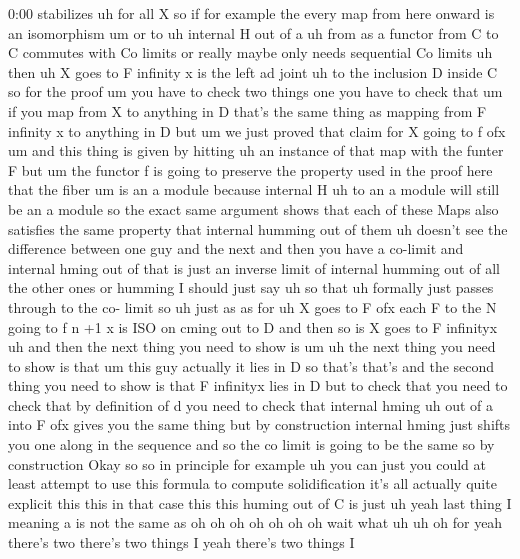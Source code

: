 \begin{unfinished}{0:00}
stabilizes
uh  for  all  X  so  if  for  example
the  every  map  from  here  onward  is  an
isomorphism
um
or
to  uh  internal  H  out  of  a  uh  from  as  a
functor  from  C  to  C  commutes  with  Co
limits  or  really  maybe  only  needs
sequential  Co
limits  uh  then
uh  X  goes  to  F  infinity  x  is  the  left  ad
joint  uh  to  the  inclusion  D  inside
C  so  for  the  proof
um  you  have  to  check  two  things  one  you
have  to  check  that  um  if  you  map  from  X
to  anything  in  D  that's  the  same  thing
as  mapping  from  F  infinity  x  to  anything
in  D  but
um  we  just  proved  that  claim  for  X  going
to  f
ofx  um  and  this  thing  is  given  by
hitting  uh  an  instance  of  that  map  with
the  funter  F  but  um  the  functor  f  is
going  to  preserve  the  property  used  in
the  proof  here  that  the  fiber  um  is  an  a
module  because  internal  H
uh  to  an  a  module  will  still  be  an  a
module  so  the  exact  same  argument  shows
that  each  of  these  Maps  also  satisfies
the  same  property  that  internal  humming
out  of  them  uh  doesn't  see  the
difference  between  one  guy  and  the  next
and  then  you  have  a  co-limit  and
internal  hming  out  of  that  is  just  an
inverse  limit  of  internal  humming  out  of
all  the  other  ones  or  humming  I  should
just  say  uh  so  that  uh  formally  just
passes  through  to  the  co-  limit  so  uh
just
as  as
for  uh  X  goes  to  F  ofx  each  F  to  the  N
going  to  f  n  +1  x  is  ISO  on  cming  out  to
D  and  then  so  is  X  goes  to  F
infinityx  uh  and  then  the  next  thing  you
need  to  show
is
um  uh  the  next  thing  you  need  to  show  is
that  um  this  guy  actually  it  lies  in  D
so  that's  that's  and  the  second  thing
you  need  to  show  is  that  F  infinityx
lies  in  D  but  to  check  that  you  need  to
check  that  by  definition  of  d  you  need
to  check  that  internal  hming  uh  out  of  a
into  F  ofx  gives  you  the  same  thing  but
by  construction  internal  hming  just
shifts  you  one  along  in  the  sequence  and
so  the  co  limit  is  going  to  be  the
same
so  by
construction
Okay  so
so  in  principle  for  example  uh  you  can
just  you  could  at  least  attempt  to  use
this  formula  to  compute
solidification  it's  all  actually  quite
explicit  this  this  in  that  case  this
this  huming  out  of  C  is  just
uh
yeah  last  thing  I  meaning  a  is  not  the
same
as  oh  oh  oh  oh  oh  oh  oh  wait
what  uh
uh  oh  for  yeah  there's  two  there's  two
things  I  yeah  there's  two  things  I

\end{unfinished}
